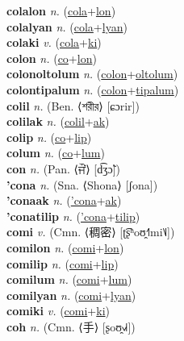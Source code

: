 \textbf{colalon} \textit{n.} (\hyperref[cola]{cola}+\hyperref[lon]{lon})
 \label{colalon} \\
\textbf{colalyan} \textit{n.} (\hyperref[cola]{cola}+\hyperref[lyan]{lyan})
 \label{colalyan} \\
\textbf{colaki} \textit{v.} (\hyperref[cola]{cola}+\hyperref[ki]{ki})
 \label{colaki} \\
\textbf{colon} \textit{n.} (\hyperref[co]{co}+\hyperref[lon]{lon})
 \label{colon} \\
\textbf{colonoltolum} \textit{n.} (\hyperref[colon]{colon}+\hyperref[oltolum]{oltolum})
 \label{colonoltolum} \\
\textbf{colontipalum} \textit{n.} (\hyperref[colon]{colon}+\hyperref[tipalum]{tipalum})
 \label{colontipalum} \\
\textbf{colil} \textit{n.} (Ben. ⟨শরীর⟩ [ɕɔrir])
 \label{colil} \\
\textbf{colilak} \textit{n.} (\hyperref[colil]{colil}+\hyperref[ak]{ak})
 \label{colilak} \\
\textbf{colip} \textit{n.} (\hyperref[co]{co}+\hyperref[lip]{lip})
 \label{colip} \\
\textbf{colum} \textit{n.} (\hyperref[co]{co}+\hyperref[lum]{lum})
 \label{colum} \\
\textbf{con} \textit{n.} (Pan. ⟨ਜੌਂ⟩ [d͡ʒɔ̃])
 \label{con} \\
\textbf{'cona} \textit{n.} (Sna. ⟨Shona⟩ [ʃona])
 \label{'cona} \\
\textbf{'conaak} \textit{n.} (\hyperref['cona]{'cona}+\hyperref[ak]{ak})
 \label{'conaak} \\
\textbf{'conatilip} \textit{n.} (\hyperref['cona]{'cona}+\hyperref[tilip]{tilip})
 \label{'conatilip} \\
\textbf{comi} \textit{v.} (Cmn. ⟨稠密⟩ [ʈ͡ʂʰoʊ̯˧˥mi˥˩])
 \label{comi} \\
\textbf{comilon} \textit{n.} (\hyperref[comi]{comi}+\hyperref[lon]{lon})
 \label{comilon} \\
\textbf{comilip} \textit{n.} (\hyperref[comi]{comi}+\hyperref[lip]{lip})
 \label{comilip} \\
\textbf{comilum} \textit{n.} (\hyperref[comi]{comi}+\hyperref[lum]{lum})
 \label{comilum} \\
\textbf{comilyan} \textit{n.} (\hyperref[comi]{comi}+\hyperref[lyan]{lyan})
 \label{comilyan} \\
\textbf{comiki} \textit{v.} (\hyperref[comi]{comi}+\hyperref[ki]{ki})
 \label{comiki} \\
\textbf{coh} \textit{n.} (Cmn. ⟨手⟩ [ʂoʊ̯˧˩˧])
